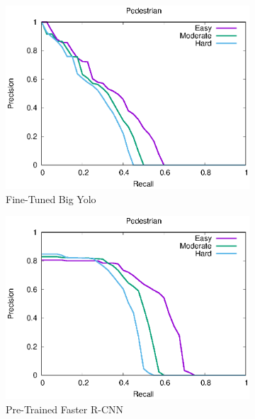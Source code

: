 \begin{figure}[H]
\begin{subfigure}[t]{.32\textwidth}
    \includegraphics[width=1.0\linewidth]{img/yolo_Dec_7_big/plot_valid_30/pedestrian_detection.eps}
    \caption{Fine-Tuned Big Yolo}
\end{subfigure}
\begin{subfigure}[t]{.32\textwidth}
    \centering
    \includegraphics[width=1.0\linewidth]{img/FRCNN_Nov_8/plot_valid_30/pedestrian_detection.eps}
    \caption{Pre-Trained Faster R-CNN}
\end{subfigure}%
\begin{subfigure}[t]{.32\textwidth}
    \centering

\end{subfigure}
\end{figure}
